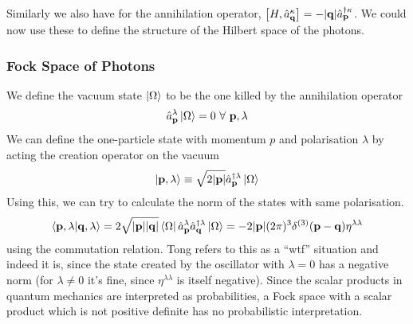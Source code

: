 Similarly we also have for the annihilation operator,  $ \left[ H, \hat{a}_{\vb{q}}^{\kappa}  \right] =-|\vb{q}|\hat{a}_{\vb{p}}^{\dagger\kappa} $. We could now use these to define the structure of the Hilbert space of the photons. 
\subsubsection{Fock Space of Photons}
We define the vacuum state $\ket{\Omega}$ to be the one killed by the annihilation operator
$$\hat{a}_{\vb{p}}^\lambda \vac = 0\ \forall \ \vb{p},\lambda$$
We can define the one-particle state with momentum $p$ and polarisation $\lambda$ by acting the creation operator on the vacuum 
$$\ket{\vb{p, \lambda}} \equiv \sqrt{2|\vb{p}|}\hat{a}_{\vb{p}}^{\dagger\lambda}\ket{\Omega}$$
Using this, we can try to calculate the norm of the states with same polarisation.
$$\braket{\vb{p},\lambda|\vb{q}, \lambda } = 2\sqrt{|\vb{p}||\vb{q}|}\bra{\Omega}\hat{a}_{\vb{p}}^{\lambda} \hat{a}_{\vb{q}}^{\dagger\lambda}\ket{\Omega} =-2|\vb{p}|(2\pi)^3 \delta^{(3)}(\vb{p}-\vb{q})\eta^{\lambda \lambda}  $$
using the commutation relation. Tong refers to this as a ``wtf'' situation and indeed it is, since the state created by the oscillator with $\lambda =0$ has a negative norm (for $\lambda\neq 0$ it's fine, since $\eta^{\lambda\lambda}$ is itself negative). Since the scalar products in quantum mechanics are interpreted as probabilities, a Fock space with a scalar product which is not positive deﬁnite has no probabilistic interpretation.
